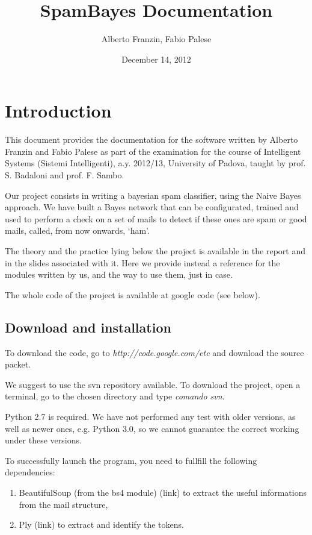 \documentclass[letterpaper,10pt,english]{sphinxmanual}
\title{SpamBayes Documentation}
\date{December 14, 2012}
\author{Alberto Franzin, Fabio Palese}
\begin{document}
\maketitle
\tableofcontents
{}\label{index::doc}



\chapter{Introduction}
\label{index:introduction}\label{index:spambayes-s-documentation}
This document provides the documentation for the software written by Alberto Franzin and Fabio Palese as part of the examination for the course of Intelligent Systems (Sistemi Intelligenti), a.y. 2012/13, University of Padova, taught by prof. S. Badaloni and prof. F. Sambo.

Our project consists in writing a bayesian spam classifier, using the Naive Bayes approach. We have built a Bayes network that can be configurated, trained and used to perform a check on a set of mails to detect if these ones are spam or good mails, called, from now onwards, `ham'.

The theory and the practice lying below the project is available in the report and in the slides associated with it. Here we provide instead a reference for the modules written by us, and the way to use them, just in case.

The whole code of the project is available at google code (see below).


\section{Download and installation}
\label{index:download-and-installation}
To download the code, go to \emph{http://code.google.com/etc} and download the source packet.

We suggest to use the svn repository available. To download the project, open a terminal, go to the chosen directory and type
\emph{comando svn}.

Python 2.7 is required. We have not performed any test with older versions, as well as newer ones, e.g. Python 3.0, so we cannot guarantee the correct working under these versions.

To successfully launch the program, you need to fullfill the following dependencies:
\begin{enumerate}
\item {} 
BeautifulSoup (from the bs4 module) (link) to extract the useful informations from the mail structure,

\item {} 
Ply (link) to extract and identify the tokens.

\end{enumerate}
\end{document}
